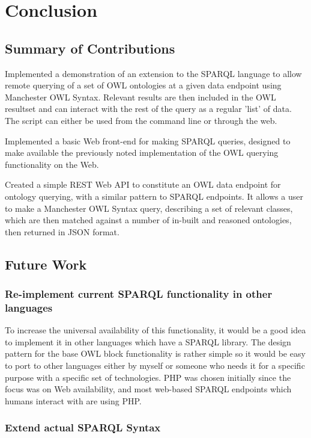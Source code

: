 \documentclass{article}
\begin{document}
\section{Conclusion}

\subsection{Summary of Contributions}

Implemented a demonstration of an extension to the SPARQL language to allow
remote querying of a set of OWL ontologies at
a given data endpoint using Manchester OWL Syntax. Relevant results are then
included in the OWL resultset and can
interact with the rest of the query as a regular 'list' of data. The script can
either be used from the command line or
through the web.

Implemented a basic Web front-end for making SPARQL queries, designed to make
available the previously noted implementation of
the OWL querying functionality on the Web.

Created a simple REST Web API to constitute an OWL data endpoint for ontology
querying, with a similar pattern to SPARQL
endpoints. It allows a user to make a Manchester OWL Syntax query, describing a
set of relevant classes, which are then
matched against a number of in-built and reasoned ontologies, then returned in
JSON format.

\subsection{Future Work}

\subsubsection{Re-implement current SPARQL functionality in other languages}

To increase the universal availability of this functionality, it would be a good
idea to implement it in other languages which
have a SPARQL library. The design pattern for the base OWL block functionality
is rather simple so it would be easy to port
to other languages either by myself or someone who needs it for a specific
purpose with a specific set of technologies. PHP
was chosen initially since the focus was on Web availability, and most web-based
SPARQL endpoints which humans interact with
are using PHP.

\subsubsection{Extend actual SPARQL Syntax}
\end{document}
